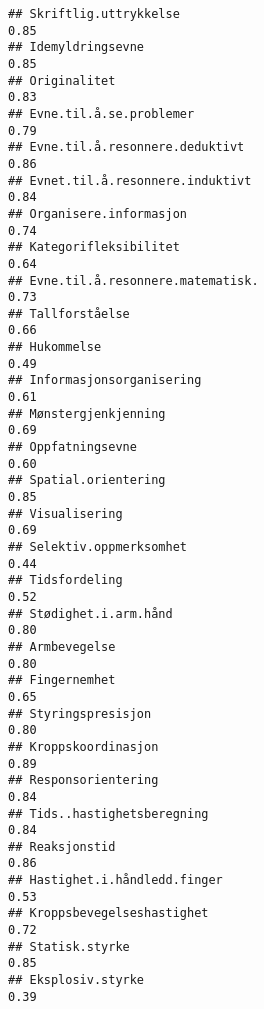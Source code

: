 \documentclass[
]{article}
\begin{document}
\begin{verbatim}
## Skriftlig.uttrykkelse                                                            0.85
## Idemyldringsevne                                                                 0.85
## Originalitet                                                                     0.83
## Evne.til.å.se.problemer                                                          0.79
## Evne.til.å.resonnere.deduktivt                                                   0.86
## Evnet.til.å.resonnere.induktivt                                                  0.84
## Organisere.informasjon                                                           0.74
## Kategorifleksibilitet                                                            0.64
## Evne.til.å.resonnere.matematisk.                                                 0.73
## Tallforståelse                                                                   0.66
## Hukommelse                                                                       0.49
## Informasjonsorganisering                                                         0.61
## Mønstergjenkjenning                                                              0.69
## Oppfatningsevne                                                                  0.60
## Spatial.orientering                                                              0.85
## Visualisering                                                                    0.69
## Selektiv.oppmerksomhet                                                           0.44
## Tidsfordeling                                                                    0.52
## Stødighet.i.arm.hånd                                                             0.80
## Armbevegelse                                                                     0.80
## Fingernemhet                                                                     0.65
## Styringspresisjon                                                                0.80
## Kroppskoordinasjon                                                               0.89
## Responsorientering                                                               0.84
## Tids..hastighetsberegning                                                        0.84
## Reaksjonstid                                                                     0.86
## Hastighet.i.håndledd.finger                                                      0.53
## Kroppsbevegelseshastighet                                                        0.72
## Statisk.styrke                                                                   0.85
## Eksplosiv.styrke                                                                 0.39

\end{verbatim}
\end{document}
